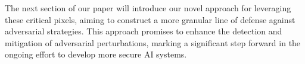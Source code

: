 \documentclass[10pt, conference, a4paper, final]{IEEEtran}
\begin{document}
    The next section of our paper will introduce our novel approach for leveraging these critical pixels, aiming to construct a more granular line of defense against adversarial strategies. This approach promises to enhance the detection and mitigation of adversarial perturbations, marking a significant step forward in the ongoing effort to develop more secure AI systems.
    




\end{document}
